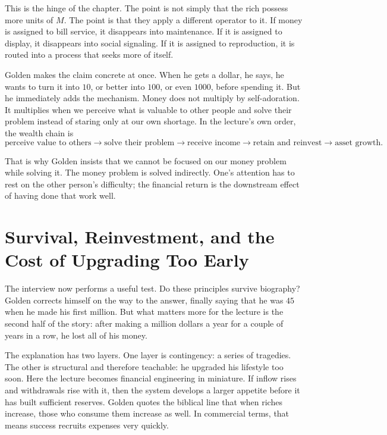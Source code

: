 This is the hinge of the chapter. The point is not simply that the rich possess more units of \(M\). The point is that they apply a different operator to it. If money is assigned to bill service, it disappears into maintenance. If it is assigned to display, it disappears into social signaling. If it is assigned to reproduction, it is routed into a process that seeks more of itself.

Golden makes the claim concrete at once. When he gets a dollar, he says, he wants to turn it into \(10\), or better into \(100\), or even \(1000\), before spending it. But he immediately adds the mechanism. Money does not multiply by self-adoration. It multiplies when we perceive what is valuable to other people and solve their problem instead of staring only at our own shortage. In the lecture's own order, the wealth chain is
\begin{equation}
\text{perceive value to others}
\rightarrow
\text{solve their problem}
\rightarrow
\text{receive income}
\rightarrow
\text{retain and reinvest}
\rightarrow
\text{asset growth}.
\end{equation}

That is why Golden insists that we cannot be focused on our money problem while solving it. The money problem is solved indirectly. One's attention has to rest on the other person's difficulty; the financial return is the downstream effect of having done that work well.

\section{Survival, Reinvestment, and the Cost of Upgrading Too Early}

The interview now performs a useful test. Do these principles survive biography? Golden corrects himself on the way to the answer, finally saying that he was \(45\) when he made his first million. But what matters more for the lecture is the second half of the story: after making a million dollars a year for a couple of years in a row, he lost all of his money.

The explanation has two layers. One layer is contingency: a series of tragedies. The other is structural and therefore teachable: he upgraded his lifestyle too soon. Here the lecture becomes financial engineering in miniature. If inflow rises and withdrawals rise with it, then the system develops a larger appetite before it has built sufficient reserves. Golden quotes the biblical line that when riches increase, those who consume them increase as well. In commercial terms, that means success recruits expenses very quickly.

